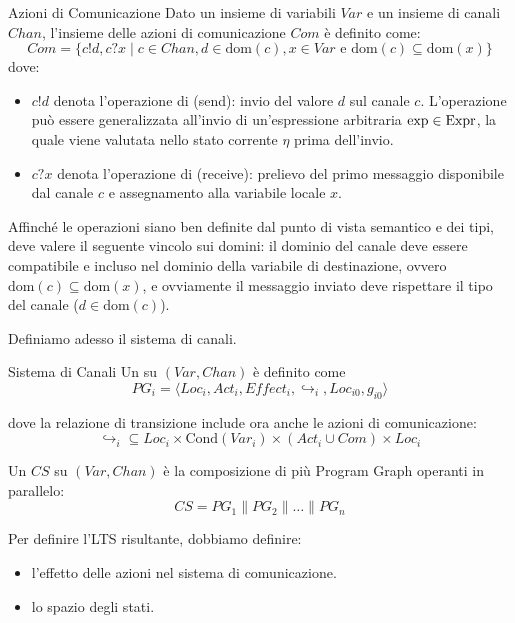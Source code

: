 \begin{definition}{Azioni di Comunicazione}
  Dato un insieme di variabili \(Var\) e un insieme di canali \(Chan\), l'insieme delle azioni di comunicazione \(Com\) è definito come:
  \[Com = \{c!d, c?x \mid c \in Chan, d \in \text{dom}(c), x \in Var \text{ e } \text{dom}(c) \subseteq \text{dom}(x)\}\]
  dove:
  \begin{itemize}
    \item \(c!d\) denota l'operazione di  (send): invio del valore \(d\) sul canale \(c\). L'operazione può essere generalizzata all'invio di un'espressione arbitraria \(\operatorname{exp} \in \operatorname{Expr}\), la quale viene valutata nello stato corrente \(\eta\) prima dell'invio.
    \item \(c?x\) denota l'operazione di  (receive): prelievo del primo messaggio disponibile dal canale \(c\) e assegnamento alla variabile locale \(x\).
  \end{itemize}
\end{definition}

\begin{note}{}
  Affinché le operazioni siano ben definite dal punto di vista semantico e dei tipi, deve valere il seguente vincolo sui domini: il dominio del canale deve essere compatibile e incluso nel dominio della variabile di destinazione, ovvero \(\text{dom}(c) \subseteq \text{dom}(x)\), e ovviamente il messaggio inviato deve rispettare il tipo del canale (\(d \in \text{dom}(c)\)).
\end{note}

Definiamo adesso il sistema di canali.

\begin{definition}{Sistema di Canali}
  Un  su \((Var, Chan)\) è definito come
  \[PG_i = \langle Loc_i, Act_i, Effect_i, \hookrightarrow_i, Loc_{i0}, g_{i0} \rangle\]
  
  dove la relazione di transizione include ora anche le azioni di comunicazione:
  \[\hookrightarrow_i \subseteq Loc_i \times \text{Cond}(Var_i) \times (Act_i \cup Com) \times Loc_i\]

  Un  \(CS\) su \((Var, Chan)\) è la composizione di più Program Graph operanti in parallelo:
  \[CS = PG_1 \parallel PG_2 \parallel \dots \parallel PG_n\]
\end{definition}


Per definire l'LTS risultante, dobbiamo definire:

\begin{itemize}
  \item l'effetto delle azioni nel sistema di comunicazione.
  \item lo spazio degli stati.
\end{itemize}

